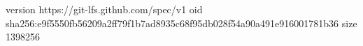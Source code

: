 version https://git-lfs.github.com/spec/v1
oid sha256:e9f5550fb56209a2ff79f1b7ad8935c68f95db028f54a90a491e916001781b36
size 1398256
